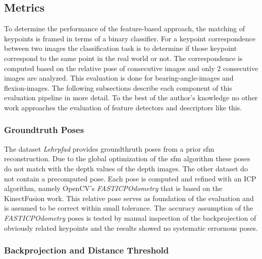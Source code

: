 \subsection{Metrics}

To determine the performance of the feature-based approach, the matching of keypoints is framed in terms of a binary classifier.
For a keypoint correspondence between two images the classification task is to determine if those keypoint correspond to the same point in the real world or not.
The correspondence is computed based on the relative pose of consecutive images and only 2 consecutive images are analyzed.
This evaluation is done for \Glspl{bearing-angle-image} and \Glspl{flexion-image}.
The following subsections describe each component of this evaluation pipeline in more detail.
To the best of the author's knowledge no other work approaches the evaluation of feature detectors and descriptors like this.

\subsubsection{Groundtruth Poses}

The dataset \emph{Lehrpfad} provides groundthruth poses from a prior \gls{sfm} reconstruction.
Due to the global optimization of the \gls{sfm} algorithm these poses do not match with the depth values of the depth images.
The other dataset do not contain a precomputed pose.
Each pose is computed and refined with an ICP algorithm, namely OpenCV's \emph{FASTICPOdometry} that is based on the KinectFusion\cite{newcombe_ismar2011} work.
This relative pose serves as foundation of the evaluation and is assumed to be correct within small tolerance.
The accuracy assumption of the \emph{FASTICPOdometry} poses is tested by manual inspection of the backprojection of obviously related keypoints and the results showed no systematic errornous poses.

\subsubsection{Backprojection and Distance Threshold}

